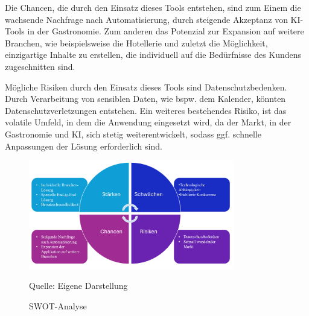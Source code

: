 Die Chancen, die durch den Einsatz dieses Tools entstehen, sind zum Einem die wachsende Nachfrage nach Automatisierung, durch steigende Akzeptanz von KI-Tools in der Gastronomie.
Zum anderen das Potenzial zur Expansion auf weitere Branchen, wie beispielsweise die Hotellerie und zuletzt die Möglichkeit, einzigartige Inhalte zu erstellen, die individuell auf die Bedürfnisse des Kundens zugeschnitten sind.

Mögliche Risiken durch den Einsatz dieses Tools sind Datenschutzbedenken.
Durch Verarbeitung von sensiblen Daten, wie bspw. dem Kalender, könnten Datenschutzverletzungen entstehen.
Ein weiteres bestehendes Risiko, ist das volatile Umfeld, in dem die Anwendung eingesetzt wird, da der Markt, in der Gastronomie und KI, sich stetig weiterentwickelt, sodass ggf. schnelle Anpassungen der Lösung erforderlich sind.

\begin{figure}[htbp]
    \centering
    \includegraphics[width=0.8\textwidth]{abbildungen/SWOT}
    \caption{SWOT-Analyse}
    \label{fig:SWOT-Analyse}
    \raggedright Quelle: Eigene Darstellung
\end{figure}

